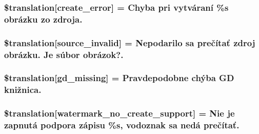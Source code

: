 \subsubsection[{\$translation}]{\setlength{\rightskip}{0pt plus 5cm}\$translation\mbox{[}\textquotesingle{}create\+\_\+error\textquotesingle{}\mbox{]} = \textquotesingle{}Chyba pri vytváraní \%s obrázku zo zdroja.\textquotesingle{}}\label{class_8upload_8sk___s_k_8php_a53013ce9255c4e1849098ddd9fdb2b3f}
\hypertarget{class_8upload_8sk___s_k_8php_a6ab0a660b457eaf2d3434b225449fdd6}{}
\subsubsection[{\$translation}]{\setlength{\rightskip}{0pt plus 5cm}\$translation\mbox{[}\textquotesingle{}source\+\_\+invalid\textquotesingle{}\mbox{]} = \textquotesingle{}Nepodarilo sa prečítať zdroj obrázku. Je súbor obrázok?.\textquotesingle{}}\label{class_8upload_8sk___s_k_8php_a6ab0a660b457eaf2d3434b225449fdd6}
\hypertarget{class_8upload_8sk___s_k_8php_a7f3dfcc0db4bbc0f2e7210c439798e56}{}
\subsubsection[{\$translation}]{\setlength{\rightskip}{0pt plus 5cm}\$translation\mbox{[}\textquotesingle{}gd\+\_\+missing\textquotesingle{}\mbox{]} = \textquotesingle{}Pravdepodobne chýba G\+D knižnica.\textquotesingle{}}\label{class_8upload_8sk___s_k_8php_a7f3dfcc0db4bbc0f2e7210c439798e56}
\hypertarget{class_8upload_8sk___s_k_8php_a82d5853430ab72dc1f9799ec36144cc6}{}
\subsubsection[{\$translation}]{\setlength{\rightskip}{0pt plus 5cm}\$translation\mbox{[}\textquotesingle{}watermark\+\_\+no\+\_\+create\+\_\+support\textquotesingle{}\mbox{]} = \textquotesingle{}Nie je zapnutá podpora zápisu \%s, vodoznak sa nedá prečítať.\textquotesingle{}}\label{class_8upload_8sk___s_k_8php_a82d5853430ab72dc1f9799ec36144cc6}
\hypertarget{class_8upload_8sk___s_k_8php_aabca0b65dadbc6184415c16375f284ca}{}
